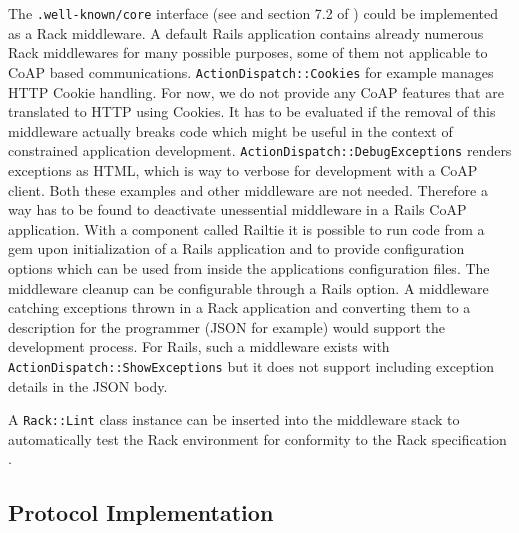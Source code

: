 		The \texttt{.well-known/core} interface (see \cite{link} and section
		7.2 of \cite{coap}) could be implemented as a Rack middleware. A
		default \ac{Rails} application contains already numerous Rack
		middlewares for many possible purposes, some of them not applicable to
		\ac{CoAP} based communications. \texttt{ActionDispatch::Cookies} for
		example manages \ac{HTTP} Cookie handling. For now, we do not provide
		any \ac{CoAP} features that are translated to \ac{HTTP} using Cookies.
		It has to be evaluated if the removal of this middleware actually
		breaks code which might be useful in the context of constrained
		application development. \texttt{ActionDispatch::DebugExceptions}
		renders exceptions as \ac{HTML}, which is way to verbose for
		development with a \ac{CoAP} client. Both these examples and other
		middleware are not needed. Therefore a way has to be found to
		deactivate unessential middleware in a \ac{Rails} \ac{CoAP}
		application. With a component called Railtie \cite{railtie} it is
		possible to run code from a gem upon initialization of a \ac{Rails}
		application and to provide configuration options which can be used from
		inside the applications configuration files. The middleware cleanup can
		be configurable through a Rails option. A middleware catching
		exceptions thrown in a Rack application and converting them to a
		description for the programmer (\ac{JSON} for example) would support
		the development process. For Rails, such a middleware exists with
		\texttt{ActionDispatch::ShowExceptions} but it does not support
		including exception details in the \ac{JSON} body.
		
		A \texttt{Rack::Lint} class instance can be inserted into the
		middleware stack to automatically test the Rack environment for
		conformity to the Rack specification \cite{rack}.

	\subsection{Protocol Implementation}
	\label{cha:design:server:coap}


